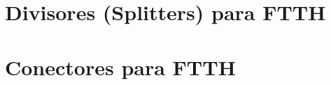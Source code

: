  \section{Divisores (Splitters) para FTTH}
 \resetallcounters
 
 \clearpage

 \section{Conectores para FTTH}
 \resetallcounters
 
 \clearpage

